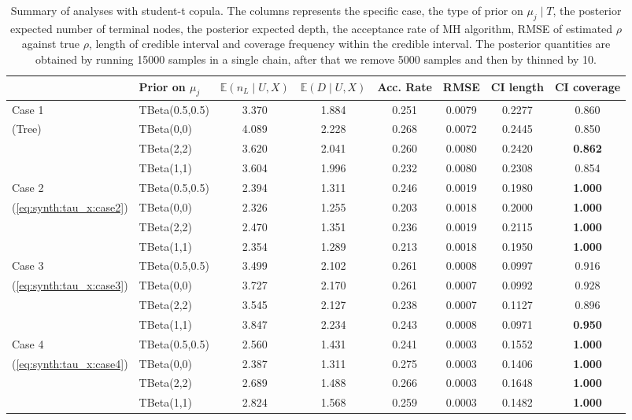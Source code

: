 \documentclass{amsart}
\begin{document}
\begin{table}[ht]
	\centering
	\caption{Summary of analyses with student-t copula. The columns represents the specific case, the type of prior on $\mu_j\mid T$, the posterior expected number of terminal nodes, the posterior expected depth, the acceptance rate of MH algorithm, RMSE of estimated $\rho$ against true $\rho$, length of credible interval and coverage frequency within the credible interval. The posterior quantities are obtained by running 15000 samples in a single chain, after that we remove 5000 samples and then by thinned by 10.}
	\label{tab:student-t:summary}
	\scriptsize{
	\begin{tabular}{ll|cccccc}
		\toprule
		& Prior on $\mu_j$ & $\mathbb{E}(n_L\mid U,X)$ & $\mathbb{E}(D\mid U,X)$ & Acc. Rate & RMSE & CI length & CI coverage \\ 
		\midrule
		Case 1 & TBeta(0.5,0.5) & 3.370 & 1.884 & 0.251 & 0.0079 & 0.2277 & 0.860 \\ 
		(Tree) & TBeta(0,0) & 4.089 & 2.228 & 0.268 & 0.0072 & 0.2445 & 0.850 \\ 
		& TBeta(2,2) & 3.620 & 2.041 & 0.260 & 0.0080 & 0.2420 & \textbf{0.862} \\ 
		& TBeta(1,1) & 3.604 & 1.996 & 0.232 & 0.0080 & 0.2308 & 0.854 \\ 
		\midrule
		Case 2 & TBeta(0.5,0.5) & 2.394 & 1.311 & 0.246 & 0.0019 & 0.1980 & \textbf{1.000} \\ 
		(\cref{eq:synth:tau_x:case2}) & TBeta(0,0) & 2.326 & 1.255 & 0.203 & 0.0018 & 0.2000 & \textbf{1.000} \\ 
		& TBeta(2,2) & 2.470 & 1.351 & 0.236 & 0.0019 & 0.2115 & \textbf{1.000} \\ 
		& TBeta(1,1) & 2.354 & 1.289 & 0.213 & 0.0018 & 0.1950 & \textbf{1.000} \\ 
		\midrule
		Case 3 & TBeta(0.5,0.5) & 3.499 & 2.102 & 0.261 & 0.0008 & 0.0997 & 0.916 \\ 
		(\cref{eq:synth:tau_x:case3}) & TBeta(0,0) & 3.727 & 2.170 & 0.261 & 0.0007 & 0.0992 & 0.928 \\ 
		& TBeta(2,2) & 3.545 & 2.127 & 0.238 & 0.0007 & 0.1127 & 0.896 \\ 
		& TBeta(1,1) & 3.847 & 2.234 & 0.243 & 0.0008 & 0.0971 & \textbf{0.950} \\ 
		\midrule
		Case 4 & TBeta(0.5,0.5) & 2.560 & 1.431 & 0.241 & 0.0003 & 0.1552 & \textbf{1.000} \\ 
		(\cref{eq:synth:tau_x:case4}) & TBeta(0,0) & 2.387 & 1.311 & 0.275 & 0.0003 & 0.1406 & \textbf{1.000} \\ 
		& TBeta(2,2) & 2.689 & 1.488 & 0.266 & 0.0003 & 0.1648 & \textbf{1.000} \\ 
		& TBeta(1,1) & 2.824 & 1.568 & 0.259 & 0.0003 & 0.1482 & \textbf{1.000} \\ 
		\end{tabular}}
\end{table}
\end{document}
